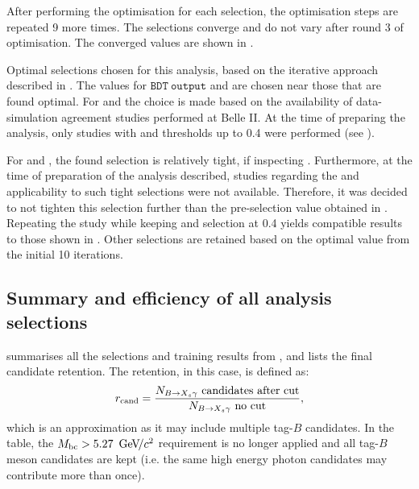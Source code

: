 After performing the optimisation for each selection, the optimisation steps are repeated 9 more times.
The selections converge and do not vary after round 3 of optimisation.
The converged values are shown in .

\begin{table}[htbp!]
    \centering
    \caption{\label{tab:interative_optimisation} Optimal selections chosen for this analysis, based on the iterative approach described in .
    The values for $\mathtt{BDT~output}$ and \ZMVA are chosen near those that are found optimal.
    For \piVeto and \etaVeto the choice is made based on the availability of data-simulation agreement studies performed at Belle II.
    At the time of preparing the analysis, 
    only studies with \piVeto and \etaVeto thresholds 
    up to 0.4 were performed (see ).
    }
    
\end{table}

For \piVeto and \etaVeto, the found selection is relatively tight, if inspecting .
Furthermore, at the time of preparation of the analysis described, studies regarding the \piVeto and \etaVeto applicability to such tight selections were not available.
Therefore, it was decided to not tighten this selection further than the pre-selection value obtained in .
Repeating the study while keeping \piVeto and \etaVeto selection at 0.4 yields compatible results to those shown in .
Other selections are retained based on the optimal value from the initial 10 iterations.

\subsection{Summary and efficiency of all analysis selections}\label{sec:selection_summary}

 summarises all the selections and \BDT training results from ,
and lists the final \BtoXsgamma candidate retention.
The retention, in this case, is defined as:
\begin{equation}\label{eq:loose_efficiency}
    r_{\mathrm{cand}} = \frac{N_{\BtoXsgamma}~\mathrm{candidates~after~cut}}{N_{\BtoXsgamma}~\mathrm{no~cut}},
\end{equation}
which is an approximation as it may include multiple tag-$B$ candidates.
In the table, the ${M_{\mathrm{bc}}}>5.27~{\mathrm{\,Ge\kern -0.1em V\!/}c^2}$ requirement is no longer applied and all tag-$B$ meson candidates are kept (i.e. the same high energy photon candidates may contribute more than once).

